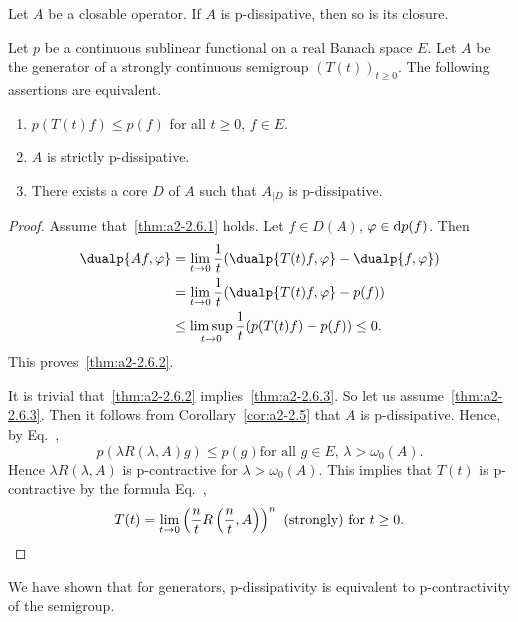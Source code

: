 \begin{corollary}\label{cor:a2-2.5}
Let $A$ be a closable operator.
If\/ $A$ is p-dissipative, then so is its closure.
\end{corollary}
\begin{theorem}\label{thm:a2-2.6}
Let $p$ be a continuous sublinear functional on a real Banach space $E$.
Let $A$ be the generator of a strongly continuous semigroup $(T(t))_{t\geq 0}$.
The following assertions are equivalent.
\begin{enumerate}[\upshape (a)]
\item \label{thm:a2-2.6.1}
$p(T(t)f) \leq p(f)$ for all $t \geq 0$, $f \in E$.

\item \label{thm:a2-2.6.2}
$A$ is strictly p-dissipative.
 
\item \label{thm:a2-2.6.3}
There exists a core $D$ of\/ $A$ such that $A_{\vert D}$ is p-dissipative.
\end{enumerate}
\end{theorem}
\begin{proof}
Assume that~\ref{thm:a2-2.6.1} holds.
Let $f \in D(A)$, $\phi \in \ddp(f)$.
Then 
\begin{align*}
	\dualp{Af,\phi} &= \lim_{t\to 0} \frac{1}{t} (\dualp{T(t)f,\phi} - \dualp{f,\phi}) \\
	&= \lim_{t\to 0} \frac{1}{t} (\dualp{T(t)f,\phi} - p(f)) \\
	&\leq \limsup_{t\to 0} \frac{1}{t} (p(T(t)f) - p(f)) \leq 0. 
\end{align*}
This proves~\ref{thm:a2-2.6.2}. 

It is trivial that~\ref{thm:a2-2.6.2} implies~\ref{thm:a2-2.6.3}.  
So let us assume~\ref{thm:a2-2.6.3}. 
Then it follows from Corollary~\ref{cor:a2-2.5}   that $A$ is p-dissipative.
Hence, by Eq.~,  
%
\[
	p(\lambda R(\lambda,A)g) \leq p(g) \text{for all $g \in E$, $\lambda > \omega_{0}(A)$}.
\]
%
Hence $\lambda R(\lambda,A)$ is p-contractive for $\lambda > \omega_{0}(A)$.
This implies that $T(t)$ is p-contractive by the formula Eq.~, 
\begin{equation*}
T(t) = \lim_{t\to 0} \left( \frac{n}{t} R\left( \frac{n}{t},A \right) \right)^{n} 
	\text{ (strongly) for } t \geq 0. \qedhere
\end{equation*}
\end{proof}
We have shown that for generators, p-dissipativity is equivalent to p-contractivity of the semigroup.
